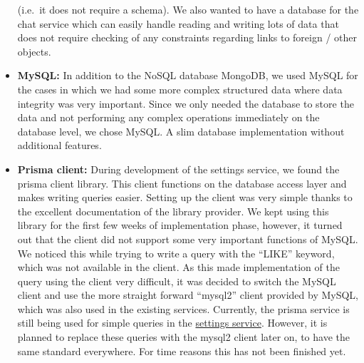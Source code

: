 \begin{itemize}
    (i.e.\ it does not require a schema).
        We also wanted to have a database for the chat service which can easily handle reading and writing lots of data
        that does not require checking of any constraints regarding links to foreign / other objects.
    \item \textbf{MySQL:} In addition to the NoSQL database MongoDB, we used MySQL for the cases in which we had some
        more complex structured data where data integrity was very important.
        Since we only needed the database to store the data and not performing any complex operations immediately on
        the database level, we chose MySQL.
        A slim database implementation without additional features.
    \item \textbf{Prisma client:} During development of the settings service, we found the prisma client library.
    This client functions on the database access layer and makes writing queries easier.
    Setting up the client was very simple thanks to the excellent documentation of the library provider.
    We kept using this library for the first few weeks of implementation phase, however, it turned out that the
    client did not support some very important functions of MySQL.
    We noticed this while trying to write a query with the \enquote{LIKE} keyword, which was not available in the
    client.
    As this made implementation of the query using the client very difficult, it was decided to switch the MySQL
    client and use the more straight forward \enquote{mysql2} client provided by MySQL, which was also used in the
    existing services.
    Currently, the prisma service is still being used for simple queries in the
    \hyperref[subsubsec:settingsSer]{settings service}.
    However, it is planned to replace these queries with the mysql2 client later on, to have the same standard
    everywhere.
    For time reasons this has not been finished yet.
\end{itemize}
